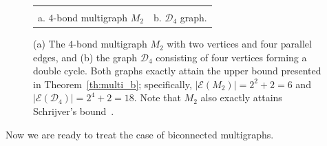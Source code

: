 \documentclass{article}
\newcommand{\fourbond}{
    \node[vertex] (u) at (0, 0) {};
    \node[vertex] (v) at (3, 0) {}; %
    \draw[edge] (u) to[bend left=30] (v);
    \draw[edge] (u) to[bend left=10] (v);
    \draw[edge] (u) to[bend right=10] (v);
    \draw[edge] (u) to[bend right=30] (v);
    \path (1.5, 0.8) (1.5, -0.8); 
}
\newcommand{\dfour}{
    \node[vertex] (v1) at (0, 1.5) {};
    \node[vertex] (v2) at (1.5, 1.5) {};
    \node[vertex] (v3) at (1.5, 0) {};
    \node[vertex] (v4) at (0, 0) {};
    \foreach \a/\b in {v1/v2, v2/v3, v3/v4, v4/v1} {
        \draw[edge] (\a) to[bend left=15] (\b);
        \draw[edge] (\a) to[bend right=15] (\b);
    }
}
\begin{document}
        \begin{figure}
            \begin{center}
		      \begin{tabular}{cc}
			
			\begin{tikzpicture}[scale=1.2]
			         \fourbond
			\end{tikzpicture}
			\hspace*{6mm}& \hspace*{6mm}
			\begin{tikzpicture}[scale=1.2]
			         \dfour
			\end{tikzpicture}\\
            a. $4$-bond multigraph $M_2$ \hspace*{6mm}& \hspace*{6mm} b. $\mathcal{D}_4$ graph.
		      \end{tabular} 
		\caption{
            (a) The $4$-bond multigraph $M_2$ with two vertices and four parallel edges, and (b) the graph $\mathcal{D}_4$ consisting of four vertices forming a double cycle. 
            Both graphs exactly attain the upper bound presented in Theorem~\ref{th:multi_b}; specifically, $|\mathcal{E}(M_2)|=2^2+2=6$ and $|\mathcal{E}(\mathcal{D}_4)|=2^4+2=18$. 
            Note that $M_2$ also exactly attains Schrijver's bound~\cite{Schrijver1983}.
            }\label{fig:multi_b}
	       \end{center}
        \end{figure}

        Now we are ready to treat the case of biconnected multigraphs.
\end{document}
